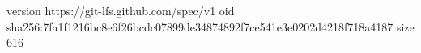 version https://git-lfs.github.com/spec/v1
oid sha256:7fa1f1216bc8e6f26bcdc07899de34874892f7ce541e3e0202d4218f718a4187
size 616
